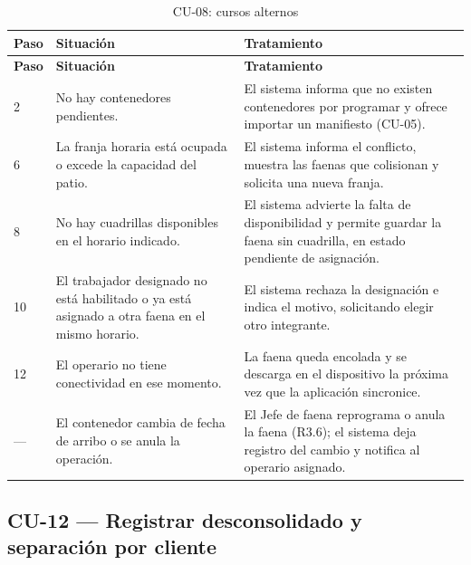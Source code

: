 {\estilotabla
\begin{longtable}{C{0.06\textwidth} L{0.38\textwidth} L{0.48\textwidth}}

\caption{CU-08: cursos alternos}
\label{tab:cu08_alt}
\\

\toprule
\textbf{Paso} & \textbf{Situación} & \textbf{Tratamiento} \\
\midrule
\endfirsthead

\toprule
\textbf{Paso} & \textbf{Situación} & \textbf{Tratamiento} \\
\midrule
\endhead

2 & No hay contenedores pendientes. &
El sistema informa que no existen contenedores por programar y ofrece importar un manifiesto
(CU-05). \\
\midrule

6 & La franja horaria está ocupada o excede la capacidad del patio. &
El sistema informa el conflicto, muestra las faenas que colisionan y solicita una nueva franja. \\
\midrule

8 & No hay cuadrillas disponibles en el horario indicado. &
El sistema advierte la falta de disponibilidad y permite guardar la faena sin cuadrilla, en estado
 pendiente de asignación. \\
\midrule

10 & El trabajador designado no está habilitado o ya está asignado a otra faena en el mismo
horario. &
El sistema rechaza la designación e indica el motivo, solicitando elegir otro integrante. \\
\midrule

12 & El operario no tiene conectividad en ese momento. &
La faena queda encolada y se descarga en el dispositivo la próxima vez que la aplicación
sincronice. \\
\midrule

--- & El contenedor cambia de fecha de arribo o se anula la operación. &
El Jefe de faena reprograma o anula la faena (R3.6); el sistema deja registro del cambio y notifica
al operario asignado. \\

\bottomrule

\end{longtable}
}

\subsection{CU-12 --- Registrar desconsolidado y separación por cliente}
\label{subsec:cu12}

